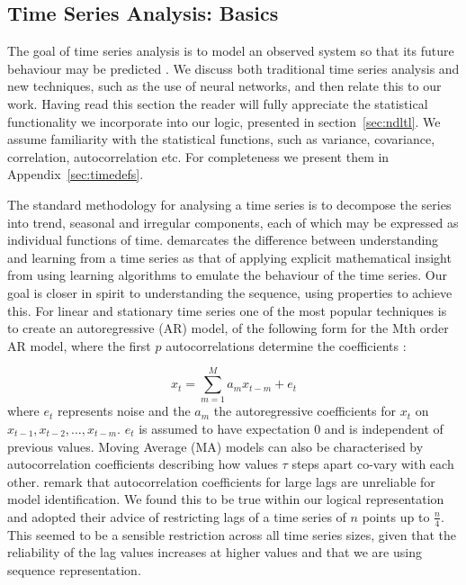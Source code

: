 \subsection{Time Series Analysis: Basics}\label{subsec:tl_tsabasic}

The goal of time series analysis is to model an observed system so
that its future behaviour may be predicted \cite{wg94}. We discuss
both traditional time series analysis and new techniques, such as the
use of neural networks, and then relate this to our work. Having read
this section the reader will fully appreciate the statistical
functionality we incorporate into our logic, presented in
section~\ref{sec:ndltl}. We assume familiarity with the statistical
functions, such as variance, covariance, correlation, autocorrelation
etc. For completeness we present them in Appendix~\ref{sec:timedefs}.

\medskip

The standard methodology for analysing a time series is to decompose
the series into trend, seasonal and irregular components, each of
which may be expressed as individual functions of time. \cite{wg94}
demarcates the difference between understanding and learning from a
time series as that of applying explicit mathematical insight from using
learning algorithms to emulate the behaviour of the time series. Our
goal is closer in spirit to understanding the sequence, using
properties to achieve this. For linear and stationary time series one
of the most popular techniques is to create an autoregressive (AR) model,
of the following form for the Mth order AR model, where the first $p$
autocorrelations determine the coefficients \cite{end95}:

\begin{displaymath}
x_t = \sum_{m=1}^M a_m x_{t-m} + e_t
\end{displaymath}
where $e_t$ represents noise and the $a_m$ the autoregressive
coefficients for $x_t$ on $x_{t-1}, x_{t-2}, \ldots, x_{t-m}$. $e_t$
is assumed to have expectation 0 and is independent of previous
values. Moving Average (MA) models can also be characterised by
autocorrelation coefficients describing how values $\tau$ steps apart
co-vary with each other. \cite{ko90} remark that autocorrelation
coefficients for large lags are unreliable for model
identification. We found this to be true within our logical
representation and adopted their advice of restricting lags of a time
series of $n$ points up to $\frac{n}{4}$. This seemed to be a sensible
restriction across all time series sizes, given that the reliability
of the lag values increases at higher values and that we are using
sequence representation.

